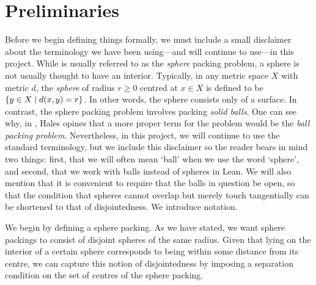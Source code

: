 \section{Preliminaries}

Before we begin defining things formally, we must include a small disclaimer about the terminology we have been using---and will continue to use---in this project. While  is usually referred to as the \textit{sphere} packing problem, a sphere is not usually thought to have an interior. Typically, in any metric space $X$ with metric $d$, the \textit{sphere} of radius $r \geq 0$ centred at $x \in X$ is defined to be $\left\{ y \in X \; \middle\vert \; d(x, y) = r \right\}$. In other words, the sphere consists only of a surface. In contrast, the sphere packing problem involves packing \textit{solid balls}. One can see why, in \cite{CannonHoney}, Hales opines that a more proper term for the problem would be the \textit{ball packing problem}. Nevertheless, in this project, we will continue to use the standard terminology, but we include this disclaimer so the reader bears in mind two things: first, that we will often mean `ball' when we use the word `sphere', and second, that we work with balls instead of spheres in Lean. We will also mention that it is convenient to require that the balls in question be open, so that the condition that spheres cannot overlap but merely touch tangentially can be shortened to that of disjointedness. We introduce notation.


We begin by defining a sphere packing. As we have stated, we want sphere packings to consist of disjoint spheres of the same radius. Given that lying on the interior of a certain sphere corresponds to being within some distance from its centre, we can capture this notion of disjointedness by imposing a separation condition on the set of centres of the sphere packing.